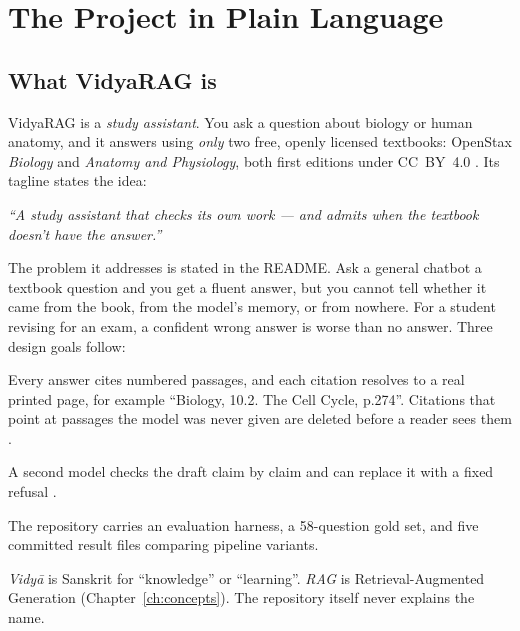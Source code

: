 \chapter{The Project in Plain Language}
\label{ch:overview}

\section{What VidyaRAG is}

VidyaRAG is a \emph{study assistant}. You ask a question about biology or human anatomy, and it answers using \emph{only} two free, openly licensed textbooks: OpenStax \emph{Biology} and \emph{Anatomy and Physiology}, both first editions under CC~BY~4.0 . Its tagline states the idea:

\begin{keyidea}
\emph{``A study assistant that checks its own work --- and admits when the textbook doesn't have the answer.''}
\end{keyidea}

The problem it addresses is stated in the README. Ask a general chatbot a textbook question and you get a fluent answer, but you cannot tell whether it came from the book, from the model's memory, or from nowhere. For a student revising for an exam, a confident wrong answer is worse than no answer. Three design goals follow:

\begin{description}[style=nextline]
  \item[Answers must be traceable.] Every answer cites numbered passages, and each citation resolves to a real printed page, for example \enquote{Biology, 10.2. The Cell Cycle, p.274}. Citations that point at passages the model was never given are deleted before a reader sees them .
  \item[It must be able to say ``the books don't cover this''.] A second model checks the draft claim by claim and can replace it with a fixed refusal .
  \item[Quality claims must be measured.] The repository carries an evaluation harness, a 58-question gold set, and five committed result files comparing pipeline variants.
\end{description}

\begin{background}
\emph{Vidy\=a} is Sanskrit for ``knowledge'' or ``learning''. \emph{RAG} is Retrieval-Augmented Generation (Chapter~\ref{ch:concepts}). The repository itself never explains the name.
\end{background}

